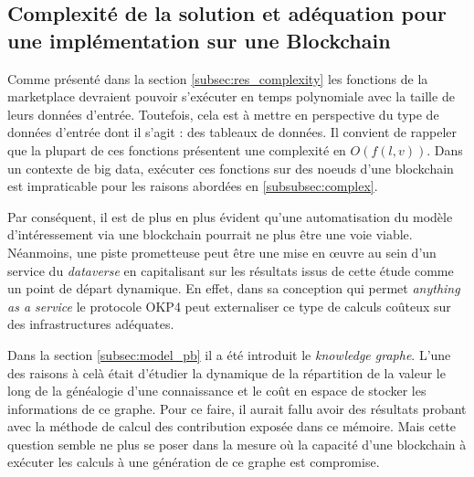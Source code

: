 \subsection{Complexité de la solution et adéquation pour une implémentation sur une Blockchain} \label{sec:discuss_complexity}

Comme présenté dans la section \ref{subsec:res_complexity} les fonctions de la marketplace devraient pouvoir s'exécuter en temps polynomiale avec la taille de leurs données d'entrée. Toutefois, cela est à mettre en perspective du type de données d'entrée dont il s'agit : des tableaux de données. Il convient de rappeler que la plupart de ces fonctions présentent une complexité en $O(f(l,v))$. Dans un contexte de big data, exécuter ces fonctions sur des noeuds d'une blockchain est impraticable pour les raisons abordées en \ref{subsubsec:complex}. 

Par conséquent, il est de plus en plus évident qu'une automatisation du modèle d'intéressement via une blockchain pourrait ne plus être une voie viable. Néanmoins, une piste prometteuse peut être une mise en œuvre au sein d'un service du \textit{dataverse} en capitalisant sur les résultats issus de cette étude comme un point de départ dynamique. En effet, dans sa conception qui permet \textit{anything as a service} le protocole OKP4 peut externaliser ce type de calculs coûteux sur des infrastructures adéquates.

Dans la section \ref{subsec:model_pb} il a été introduit le \textit{knowledge graphe}. L'une des raisons à celà était d'étudier la dynamique de la répartition de la valeur le long de la généalogie d'une connaissance et le coût en espace de stocker les informations de ce graphe. Pour ce faire, il aurait fallu avoir des résultats probant avec la méthode de calcul des contribution exposée dans ce mémoire. Mais cette question semble ne plus se poser dans la mesure où la capacité d'une blockchain à exécuter les calculs à une génération de ce graphe est compromise. 


